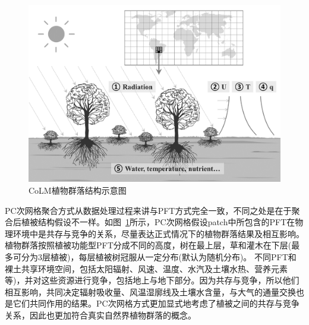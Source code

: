 {
\begin{figure}[htbp]
\centering
\includegraphics[width=1\textwidth]{Figures/尺度转换/植物群落结构示意图.png}
\caption{CoLM植物群落结构示意图}
\label{fig:植物群落结构示意图}
\end{figure}
}

PC次网格聚合方式从数据处理过程来讲与PFT方式完全一致，不同之处是在于聚合后植被结构假设不一样。如图~\ref{fig:植物群落结构示意图}所示，PC次网格假设patch中所包含的PFT在物理环境中是共存与竞争的关系，尽量表达正式情况下的植物群落结果及相互影响。植物群落按照植被功能型PFT分成不同的高度，树在最上层，草和灌木在下层(最多可分为3层植被)，每层植被树冠服从一定分布(默认为随机分布)。 不同PFT和裸土共享环境空间，包括太阳辐射、风速、温度、水汽及土壤水热、营养元素等)，并对这些资源进行竞争，包括地上与地下部分。因为共存与竞争，所以他们相互影响，共同决定辐射吸收量、风温湿廓线及土壤水含量，与大气的通量交换也是它们共同作用的结果。PC次网格方式更加显式地考虑了植被之间的共存与竞争关系，因此也更加符合真实自然界植物群落的概念。
